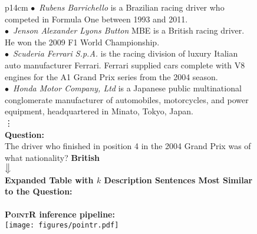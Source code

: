 \documentclass[11pt]{article}
\newcommand{\pointr}{\textsc{PointR}\xspace}
\begin{document}
\begin{figure*}[th]
\begin{tabular}{p{14cm}}
$\bullet$~\emph{Rubens Barrichello} is a Brazilian racing driver who competed in Formula One between 1993 and 2011. \\
$\bullet$~\emph{Jenson Alexander Lyons Button} MBE is a British racing driver. He won the 2009 F1 World Championship. \\
$\bullet$~\emph{Scuderia Ferrari S.p.A.} is the racing division of luxury Italian auto manufacturer Ferrari. Ferrari supplied cars complete with V8 engines for the A1 Grand Prix series from the 2004 season. \\
$\bullet$~\emph{Honda Motor Company, Ltd} is a Japanese public multinational conglomerate manufacturer of automobiles, motorcycles, and power equipment, headquartered in Minato, Tokyo, Japan. \\
\hspace{7cm}\vdots \\
\textbf{Question:} \\
The driver who finished in position 4 in the 2004 Grand Prix was of what nationality? \textbf{British} \\
\vspace{-1mm}
\hspace{7cm}$\big\Downarrow$ \\
\vspace{-1mm}
\textbf{Expanded Table with $k$ Description Sentences Most Similar to the Question:} \\
\\
\vspace{5pt}
\textbf{\pointr inference pipeline:} \\
\centering
\texttt{[image: figures/pointr.pdf]}

\end{tabular}
\end{figure*}
\end{document}
